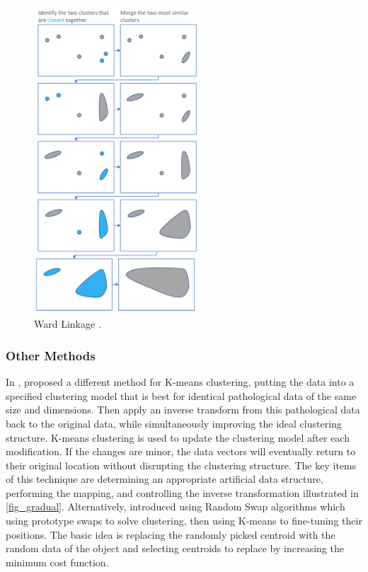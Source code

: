\documentclass[a4paper, 12pt]{article}
\begin{document}
\begin{figure}[htbp!]
    \centering
    \includegraphics[width=0.55\textwidth]{Ward Linkage.png}
    \caption{Ward Linkage \citep{hierarchicaltutorial2017}.}
    \label{fig15}
\end{figure}

\pagebreak

\subsubsection{Other Methods}
In \citeyear{malinen2014k}, \citet{malinen2014k} proposed a different method for K-means clustering, putting the data into a specified clustering model that is best for identical pathological data of the same size and dimensions. Then apply an inverse transform from this pathological data back to the original data, while simultaneously improving the ideal clustering structure. K-means clustering is used to update the clustering model after each modification. If the changes are minor, the data vectors will eventually return to their original location without disrupting the clustering structure. The key items of this technique are determining an appropriate artificial data structure, performing the mapping, and controlling the inverse transformation illustrated in \autoref{fig_gradual}. Alternatively, \citet{franti2018efficiency} introduced using Random Swap algorithms which using prototype swaps to solve clustering, then using K-means to fine-tuning their positions. The basic idea is replacing the randomly picked centroid with the random data of the object and selecting centroids to replace by increasing the minimum cost function.
\end{document}

